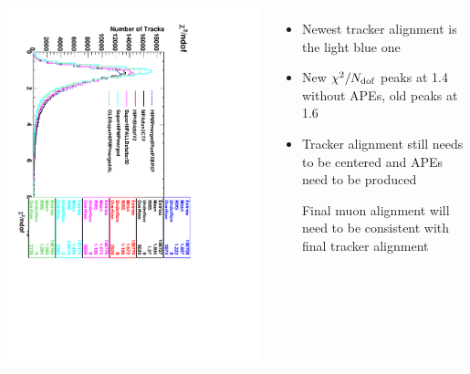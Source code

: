 \documentclass[compress]{beamer}
\begin{document}
\begin{frame}
\vspace{-0.35 cm}
\begin{columns}
\includegraphics[height=\linewidth, angle=90]{SuperHIPMPmerged_TrackChi2n.pdf}
\begin{itemize}\setlength{\itemsep}{-0.05 cm}\scriptsize
\item Newest tracker alignment is the light blue one
\item New $\chi^2/N_{\mbox{\scriptsize dof}}$ peaks at 1.4 without APEs, old peaks at 1.6
\item Tracker alignment still needs to be centered and APEs need to be produced

Final muon alignment will need to be consistent with final tracker alignment
\end{itemize}
\end{columns}
\end{frame}
\end{document}
